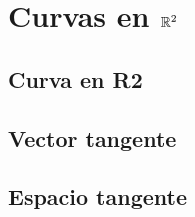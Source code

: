 \chapter{Curvas en $\mathbb{R}^{2}$}\label{ch:curvas-en-r2}
\section{Curva en R2}
\section{Vector tangente}
\section{Espacio tangente}
